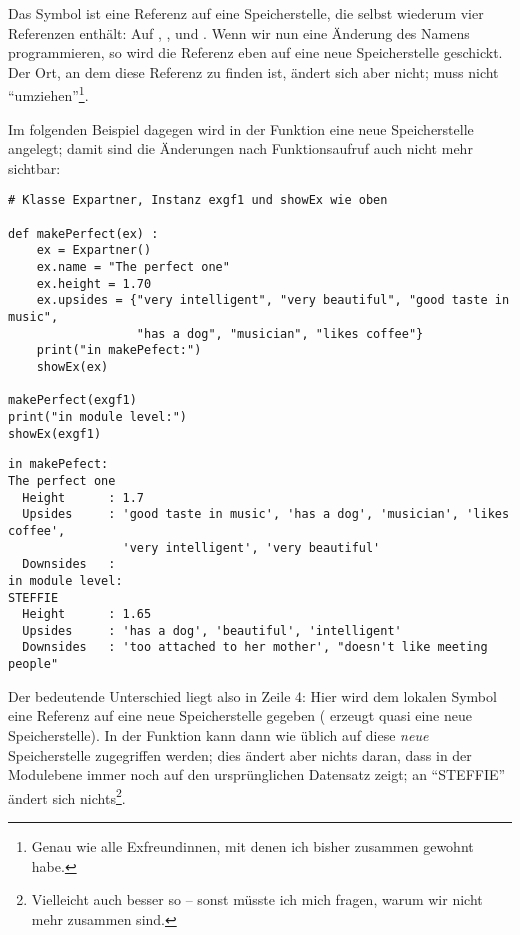 Das Symbol  ist eine Referenz auf eine Speicherstelle, die selbst wiederum vier Referenzen enthält: Auf , ,  und . Wenn wir nun eine Änderung des Namens programmieren, so wird die Referenz  eben auf eine neue Speicherstelle geschickt. Der Ort, an dem diese Referenz zu finden ist, ändert sich aber nicht;  muss nicht \enquote{umziehen}\footnote{Genau wie alle Exfreundinnen, mit denen ich bisher zusammen gewohnt habe.}.

Im folgenden Beispiel dagegen wird in der Funktion eine neue Speicherstelle angelegt; damit sind die Änderungen nach Funktionsaufruf auch nicht mehr sichtbar:
\begin{codebox}
\begin{verbatim}
# Klasse Expartner, Instanz exgf1 und showEx wie oben

def makePerfect(ex) :
    ex = Expartner()
    ex.name = "The perfect one"
    ex.height = 1.70
    ex.upsides = {"very intelligent", "very beautiful", "good taste in music",
                  "has a dog", "musician", "likes coffee"}
    print("in makePefect:")
    showEx(ex)
    
makePerfect(exgf1)
print("in module level:")
showEx(exgf1)
\end{verbatim}
\end{codebox}
\begin{cmdbox}
\begin{verbatim}
in makePefect:
The perfect one
  Height      : 1.7
  Upsides     : 'good taste in music', 'has a dog', 'musician', 'likes coffee',
                'very intelligent', 'very beautiful'
  Downsides   : 
in module level:
STEFFIE
  Height      : 1.65
  Upsides     : 'has a dog', 'beautiful', 'intelligent'
  Downsides   : 'too attached to her mother', "doesn't like meeting people"
\end{verbatim}
\end{cmdbox}

Der bedeutende Unterschied liegt also in Zeile 4: Hier wird dem lokalen Symbol  eine Referenz auf eine neue Speicherstelle gegeben ( erzeugt quasi eine neue Speicherstelle). In der Funktion  kann dann wie üblich auf diese \emph{neue} Speicherstelle zugegriffen werden; dies ändert aber nichts daran, dass  in der Modulebene immer noch auf den ursprünglichen Datensatz zeigt; an \enquote{STEFFIE} ändert sich nichts\footnote{Vielleicht auch besser so -- sonst müsste ich mich fragen, warum wir nicht mehr zusammen sind.}.


